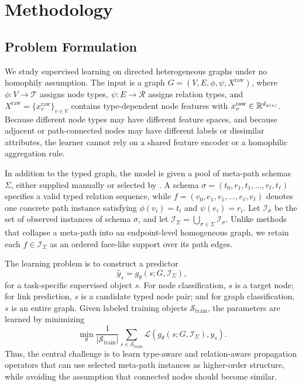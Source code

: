 \section{Methodology}
\label{sec:method}

\subsection{Problem Formulation}

We study supervised learning on directed heterogeneous graphs under no homophily assumption.  The
input is a graph
\(G=(V,E,\phi,\psi,X^{\mathrm{raw}})\), where
\(\phi:V\rightarrow\mathcal{T}\) assigns node types,
\(\psi:E\rightarrow\mathcal{R}\) assigns relation types, and
\(X^{\mathrm{raw}}=\{x_v^{\mathrm{raw}}\}_{v\in V}\) contains type-dependent node features with
\(x_v^{\mathrm{raw}}\in\mathbb{R}^{d_{\phi(v)}}\).  Because different node types may have different feature
spaces, and because adjacent or path-connected nodes may have different labels or dissimilar
attributes, the learner cannot rely on a shared feature encoder or a homophilic aggregation rule.

In addition to the typed graph, the model is given a pool of meta-path schemas
\(\Sigma\), either supplied manually or selected by \ampss{}.  A schema
\(\sigma=(t_0,r_1,t_1,\ldots,r_\ell,t_\ell)\) specifies a valid typed relation sequence, while
\(f=(v_0,e_1,v_1,\ldots,e_\ell,v_\ell)\) denotes one concrete path instance satisfying
\(\phi(v_i)=t_i\) and \(\psi(e_i)=r_i\).  Let \(\mathcal{I}_\sigma\) be the set of observed
instances of schema \(\sigma\), and let
\(\mathcal{I}_\Sigma=\bigcup_{\sigma\in\Sigma}\mathcal{I}_\sigma\).  Unlike methods that collapse a
meta-path into an endpoint-level homogeneous graph, we retain each
\(f\in\mathcal{I}_\Sigma\) as an ordered face-like support over its path edges.

The learning problem is to construct a predictor
\[
  \hat{y}_s
  =
  g_\theta(s;G,\mathcal{I}_\Sigma),
\]
for a task-specific supervised object \(s\).  For node classification, \(s\) is a target node; for
link prediction, \(s\) is a candidate typed node pair; and for graph classification, \(s\) is an
entire graph.  Given labeled training objects \(\mathcal{S}_{\mathrm{train}}\), the parameters are
learned by minimizing
\[
  \min_\theta
  \frac{1}{|\mathcal{S}_{\mathrm{train}}|}
  \sum_{s\in\mathcal{S}_{\mathrm{train}}}
  \mathcal{L}\!\left(g_\theta(s;G,\mathcal{I}_\Sigma),y_s\right).
\]
Thus, the central challenge is to learn type-aware and relation-aware propagation operators that
can use selected meta-path instances as higher-order structure, while avoiding the assumption that
connected nodes should become similar.

